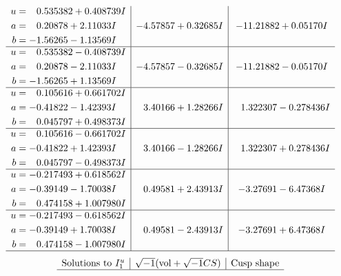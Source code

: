 \documentclass[1p]{elsarticle_modified}
\theoremstyle{definition}
\newcommand{\I}{\sqrt{-1}}
\begin{document}
$$\begin{array}{c|c|c}
\begin{aligned}
u &= \phantom{-}0.535382 + 0.408739 I \\
a &= \phantom{-}0.20878 + 2.11033 I \\
b &= -1.56265 - 1.13569 I\end{aligned}
 & -4.57857 + 0.32685 I & -11.21882 + 0.05170 I \\ \hline\begin{aligned}
u &= \phantom{-}0.535382 - 0.408739 I \\
a &= \phantom{-}0.20878 - 2.11033 I \\
b &= -1.56265 + 1.13569 I\end{aligned}
 & -4.57857 - 0.32685 I & -11.21882 - 0.05170 I \\ \hline\begin{aligned}
u &= \phantom{-}0.105616 + 0.661702 I \\
a &= -0.41822 - 1.42393 I \\
b &= \phantom{-}0.045797 + 0.498373 I\end{aligned}
 & \phantom{-}3.40166 + 1.28266 I & \phantom{-}1.322307 - 0.278436 I \\ \hline\begin{aligned}
u &= \phantom{-}0.105616 - 0.661702 I \\
a &= -0.41822 + 1.42393 I \\
b &= \phantom{-}0.045797 - 0.498373 I\end{aligned}
 & \phantom{-}3.40166 - 1.28266 I & \phantom{-}1.322307 + 0.278436 I \\ \hline\begin{aligned}
u &= -0.217493 + 0.618562 I \\
a &= -0.39149 - 1.70038 I \\
b &= \phantom{-}0.474158 + 1.007980 I\end{aligned}
 & \phantom{-}0.49581 + 2.43913 I & -3.27691 - 6.47368 I \\ \hline\begin{aligned}
u &= -0.217493 - 0.618562 I \\
a &= -0.39149 + 1.70038 I \\
b &= \phantom{-}0.474158 - 1.007980 I\end{aligned}
 & \phantom{-}0.49581 - 2.43913 I & -3.27691 + 6.47368 I\\
 \hline 
 \end{array}$$\newpage$$\begin{array}{c|c|c}  
\text{Solutions to }I^u_{1}& \I (\text{vol} + \sqrt{-1}CS) & \text{Cusp shape}\\
 \hline 

\end{array}$$
\end{document}
